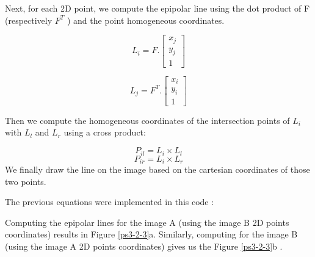 \documentclass[a4paper,11pt]{article}
\begin{document}
Next, for each 2D point, we compute the epipolar line using the dot product of
F (respectively $F^T$ ) and the point homogeneous coordinates.

$$ L_{i} = 
F
.
\begin{bmatrix}
 x_{j} \\ y_{j} \\ 1
\end{bmatrix}
$$

$$ L_{j} = 
F^{T}
.
\begin{bmatrix}
 x_{i} \\ y_{i} \\ 1
\end{bmatrix}
$$

Then we compute the homogeneous coordinates of the intersection points of $L_{i}$
with $L_l$ and $L_r$  using a cross product:

$$P_{il} = L_{i} \times L_{l}$$
$$P_{ir} = L_{i} \times L_{r}$$
We finally draw the line on the image based on the cartesian coordinates of those
two points.

The previous equations were implemented in this code : 

\lstset{style=mystyle}


Computing the epipolar lines for the image A (using the image B 2D points coordinates) results in Figure \ref{ps3-2-3}a.
Similarly, computing for the image B (using the image A 2D points coordinates) gives us the Figure \ref{ps3-2-3}b .
\end{document}
